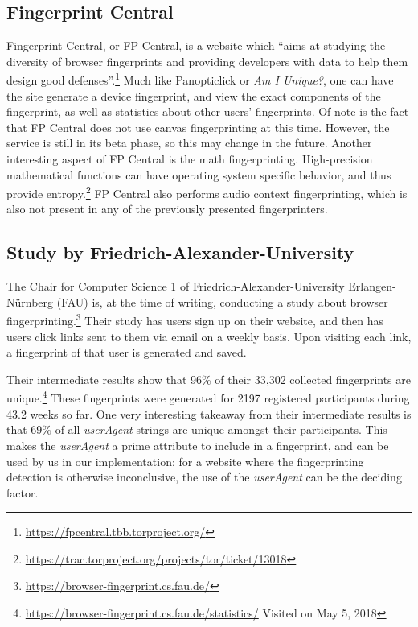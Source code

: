 \documentclass[
    fontsize=12pt,
    headings=small,
    parskip=half,
    bibliography=totoc,
    numbers=noenddot,
    open=any
    ]{scrreprt}
\begin{document}
\subsection{Fingerprint Central}
\label{related_work:fp_central}
Fingerprint Central, or FP Central, is a website which ``aims at studying the diversity
of browser fingerprints and providing developers with data to help them design good defenses''.\footnote{\url{https://fpcentral.tbb.torproject.org/}}
Much like Panopticlick or \textit{Am I Unique?}, one can have the site generate a device fingerprint,
and view the exact components of the fingerprint, as well as statistics about other users' fingerprints.
Of note is the fact that FP Central does not use canvas fingerprinting at this time.
However, the service is still in its beta phase, so this may change in the future.
Another interesting aspect of FP Central is the math fingerprinting.
High-precision mathematical functions can have operating system specific behavior, and thus provide
entropy.\footnote{\url{https://trac.torproject.org/projects/tor/ticket/13018}}
FP Central also performs audio context fingerprinting, which is also not present in any of the previously presented
fingerprinters.

\subsection{Study by Friedrich-Alexander-University}
The Chair for Computer Science 1 of Friedrich-Alexander-University Erlangen-Nürnberg (FAU)
is, at the time of writing, conducting a study about
browser fingerprinting.\footnote{\url{https://browser-fingerprint.cs.fau.de/}}
Their study has users sign up on their website, and then has users click links
sent to them via email on a weekly basis. Upon visiting each link, a fingerprint of that user is
generated and saved.

Their intermediate results show that 96\% of their 33,302 collected fingerprints are
unique.\footnote{\url{https://browser-fingerprint.cs.fau.de/statistics/} Visited on May 5, 2018}
These fingerprints were generated for 2197 registered participants during 43.2 weeks so far.
One very interesting takeaway from their intermediate results is that 69\%
of all \textit{userAgent} strings are unique amongst their participants.
This makes the \textit{userAgent} a prime attribute to include in a fingerprint,
and can be used by us in our implementation; for a website where the fingerprinting detection
is otherwise inconclusive, the use of the \textit{userAgent} can be the deciding factor.
\end{document}
